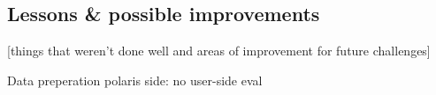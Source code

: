 \documentclass[journal=jcim,manuscript=article]{achemso}
\begin{document}
\subsection{Lessons & possible improvements}
[things that weren’t done well and areas of improvement for future challenges]


Data preperation
polaris side:
no user-side eval

\end{document}

